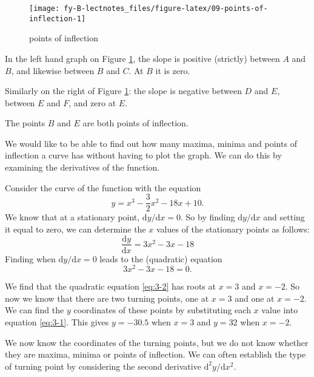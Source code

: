 \documentclass[
  11pt,
  oneside]{book}
\newcommand{\slide}{}
\theoremstyle{definition}
\theoremstyle{definition}
\theoremstyle{definition}
\theoremstyle{definition}
\theoremstyle{remark}
\begin{document}
\slide

\begin{figure}

{\centering \texttt{[image: fy-B-lectnotes\_files/figure-latex/09-points-of-inflection-1]} 

}

\caption{points of inflection}\label{fig:09-points-of-inflection}
\end{figure}

In the left hand graph on Figure \ref{fig:09-points-of-inflection}, the slope is positive (strictly) between \(A\) and \(B\), and likewise between \(B\) and \(C\). At \(B\) it is zero.

Similarly on the right of Figure \ref{fig:09-points-of-inflection}:
the slope is negative between \(D\) and \(E\), between \(E\) and \(F\), and zero at \(E\).

The points \(B\) and \(E\) are both points of inflection.
\slide

We would like to be able to find out how many maxima, minima and points of inflection a curve has without having to plot the graph. We can do this by examining the derivatives of the function.

Consider the curve of the function with the equation
\[
y = x^3-\frac 32x^2-18x+10.
\]
We know that at a stationary point, \(\mathrm{d}y/\mathrm{d} x=0\). So by finding \(\mathrm{d}y/\mathrm{d} x\) and setting it equal to zero, we can determine the \(x\) values of the stationary points as follows:
\begin{equation}
\frac{\mathrm{d} y}{\mathrm{d} x} = 3x^2-3x-18
\label{eq:3-1}
\end{equation}
Finding when \(\mathrm{d}y/\mathrm{d} x = 0\) leads to the (quadratic) equation
\begin{equation}
3x^2-3x-18=0.
\label{eq:3-2}
\end{equation}

We find that the quadratic equation \eqref{eq:3-2} has roots at \(x = 3\) and \(x = -2\). So now we know that there are two turning points, one at \(x = 3\) and one at \(x = -2\). We can find the \(y\) coordinates of these points by substituting each \(x\) value into equation \eqref{eq:3-1}. This gives \(y = -30.5\) when \(x = 3\) and \(y = 32\) when \(x = -2\).

We now know the coordinates of the turning points, but we do not know whether they are maxima, minima or points of inflection. We can often establish the type of turning point by considering the second derivative \(\mathrm{d}^{2}y/\mathrm{d} x^2\).
\slide
\end{document}
